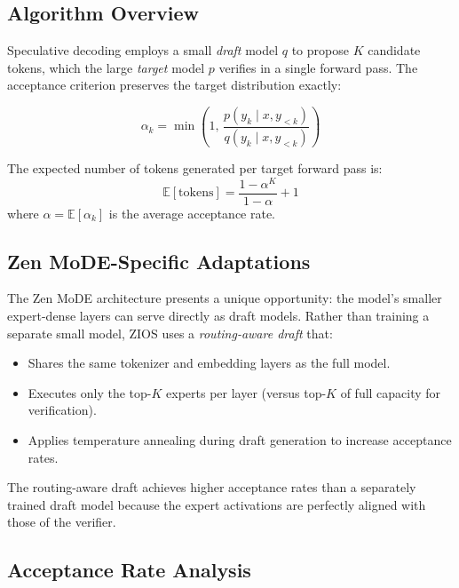 \documentclass[11pt,a4paper]{article}
\begin{document}
\subsection{Algorithm Overview}

Speculative decoding employs a small \emph{draft} model $q$ to propose $K$ candidate tokens, which the large \emph{target} model $p$ verifies in a single forward pass. The acceptance criterion preserves the target distribution exactly:

\begin{equation}
\alpha_k = \min\!\left(1,\, \frac{p(y_k \mid x, y_{<k})}{q(y_k \mid x, y_{<k})}\right)
\end{equation}

The expected number of tokens generated per target forward pass is:
\begin{equation}
\mathbb{E}[\text{tokens}] = \frac{1 - \alpha^K}{1 - \alpha} + 1
\end{equation}
where $\alpha = \mathbb{E}[\alpha_k]$ is the average acceptance rate.

\subsection{Zen MoDE-Specific Adaptations}

The Zen MoDE architecture presents a unique opportunity: the model's smaller expert-dense layers can serve directly as draft models. Rather than training a separate small model, ZIOS uses a \emph{routing-aware draft} that:

\begin{itemize}
  \item Shares the same tokenizer and embedding layers as the full model.
  \item Executes only the top-$K$ experts per layer (versus top-$K$ of full capacity for verification).
  \item Applies temperature annealing during draft generation to increase acceptance rates.
\end{itemize}

The routing-aware draft achieves higher acceptance rates than a separately trained draft model because the expert activations are perfectly aligned with those of the verifier.

\subsection{Acceptance Rate Analysis}
\end{document}
